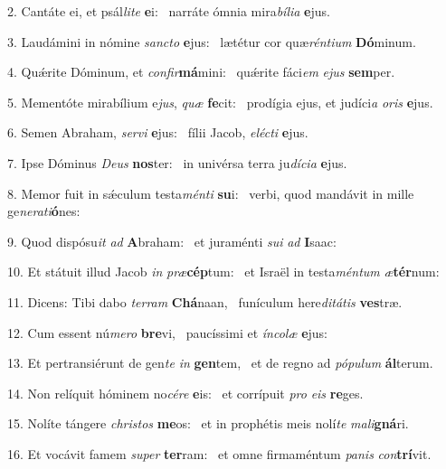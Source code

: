 2. Cantáte ei, et psál\textit{li}\textit{te} \textbf{e}i: \ast\  narráte ómnia mira\textit{bí}\textit{li}\textit{a} \textbf{e}jus.\

3. Laudámini in nómine \textit{sanc}\textit{to} \textbf{e}jus: \ast\  lætétur cor quæ\textit{rén}\textit{ti}\textit{um} \textbf{Dó}minum.\

4. Quǽrite Dóminum, et \textit{con}\textit{fir}\textbf{má}mini: \ast\  quǽrite fáci\textit{em} \textit{e}\textit{jus} \textbf{sem}per.\

5. Mementóte mirabílium e\textit{jus}, \textit{quæ} \textbf{fe}cit: \ast\  prodígia ejus, et judíci\textit{a} \textit{o}\textit{ris} \textbf{e}jus.\

6. Semen Abraham, \textit{ser}\textit{vi} \textbf{e}jus: \ast\  fílii Jacob, \textit{e}\textit{léc}\textit{ti} \textbf{e}jus.\

7. Ipse Dóminus \textit{De}\textit{us} \textbf{nos}ter: \ast\  in univérsa terra ju\textit{dí}\textit{ci}\textit{a} \textbf{e}jus.\

8. Memor fuit in sǽculum testa\textit{mén}\textit{ti} \textbf{su}i: \ast\  verbi, quod mandávit in mille ge\textit{ne}\textit{ra}\textit{ti}\textbf{ó}nes:\

9. Quod dispósu\textit{it} \textit{ad} \textbf{A}braham: \ast\  et juraménti \textit{su}\textit{i} \textit{ad} \textbf{I}saac:\

10. Et státuit illud Jacob \textit{in} \textit{præ}\textbf{cép}tum: \ast\  et Israël in testa\textit{mén}\textit{tum} \textit{æ}\textbf{tér}num:\

11. Dicens: Tibi dabo \textit{ter}\textit{ram} \textbf{Chá}naan, \ast\  funículum here\textit{di}\textit{tá}\textit{tis} \textbf{ves}træ.\

12. Cum essent nú\textit{me}\textit{ro} \textbf{bre}vi, \ast\  paucíssimi et \textit{ín}\textit{co}\textit{læ} \textbf{e}jus:\

13. Et pertransiérunt de gen\textit{te} \textit{in} \textbf{gen}tem, \ast\  et de regno ad \textit{pó}\textit{pu}\textit{lum} \textbf{ál}terum.\

14. Non relíquit hóminem no\textit{cé}\textit{re} \textbf{e}is: \ast\  et corrípuit \textit{pro} \textit{e}\textit{is} \textbf{re}ges.\

15. Nolíte tángere \textit{chris}\textit{tos} \textbf{me}os: \ast\  et in prophétis meis nolí\textit{te} \textit{ma}\textit{li}\textbf{gná}ri.\

16. Et vocávit famem \textit{su}\textit{per} \textbf{ter}ram: \ast\  et omne firmaméntum \textit{pa}\textit{nis} \textit{con}\textbf{trí}vit.\

